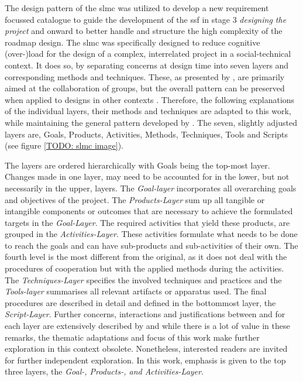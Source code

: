 The design pattern of the \acrshort*{slmc} was utilized to develop a new requirement focussed catalogue to guide the development of the \acrshort*{ssf} in stage 3 \textit{designing the project} and onward to better handle and structure the high complexity of the roadmap design. The \acrshort*{slmc} was specifically designed to reduce cognitive (over-)load for the design of a complex, interrelated project in a social-technical context. It does so, by separating concerns at design time into seven layers and  corresponding methods and techniques. These, as presented by \autocite{briggsSevenLayerModelCollaboration}, are primarily aimed at the collaboration of groups, but the overall pattern can be preserved when applied to designs in other contexts \autocite{diggelenGroundedDesignDesign2009}. Therefore, the following explanations of the individual layers, their methods and techniques are adapted to this work, while maintaining the general pattern developed by \autocite{briggsSevenLayerModelCollaboration}. The seven, slightly adjusted layers are, Goals, Products, Activities, Methods, Techniques, Tools and Scripts (see figure \ref*{TODO: slmc image}). 


The layers are ordered hierarchically with Goals being the top-most layer. Changes made in one layer, may need to be accounted for in the lower, but not necessarily in the upper, layers. The \textit{Goal-layer} incorporates all overarching goals and objectives of the project. The \textit{Products-Layer} sum up all tangible or intangible components or outcomes that are necessary to achieve the formulated targets in the \textit{Goal-Layer}. The required activities that yield these products, are grouped in the \textit{Activities-Layer}. These activities formulate what needs to be done to reach the goals and can have sub-products and sub-activities of their own. The fourth level is the most different from the original, as it does not deal with the procedures of cooperation but with the applied methods during the activities. The \textit{Techniques-Layer} specifies the involved techniques and practices and the \textit{Tools-layer} summarises all relevant artifacts or apparatus used. The final procedures are described in detail and defined in the bottommost layer, the \textit{Script-Layer}. Further concerns, interactions and justifications between and for each layer are extensively described by \autocite{briggsSevenLayerModelCollaboration} and while there is a lot of value in these remarks, the thematic adaptations and focus of this work make further exploration in this context obsolete. Nonetheless, interested readers are invited for further independent exploration. In this work, emphasis is given to the top three layers, the \textit{Goal-, Products-, and Activities-Layer}.


